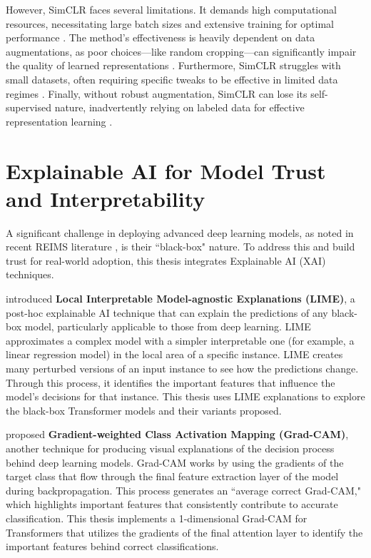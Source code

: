 However, SimCLR faces several limitations. It demands high computational resources, necessitating large batch sizes and extensive training for optimal performance \citep{Chen2020b}. The method's effectiveness is heavily dependent on data augmentations, as poor choices—like random cropping—can significantly impair the quality of learned representations \citep{Chen2020a}. Furthermore, SimCLR struggles with small datasets, often requiring specific tweaks to be effective in limited data regimes \citep{Kinakh2021}. Finally, without robust augmentation, SimCLR can lose its self-supervised nature, inadvertently relying on labeled data for effective representation learning \citep{Chen2020a}.

\section{Explainable AI for Model Trust and Interpretability}

A significant challenge in deploying advanced deep learning models, as noted in recent REIMS literature \citep{Cardoso2025}, is their ``black-box" nature. To address this and build trust for real-world adoption, this thesis integrates Explainable AI (XAI) techniques.

\cite{Ribeiro2016} introduced \textbf{Local Interpretable Model-agnostic Explanations (LIME)}, a post-hoc explainable AI technique that can explain the predictions of any black-box model, particularly applicable to those from deep learning. LIME approximates a complex model with a simpler interpretable one (for example, a linear regression model) in the local area of a specific instance. LIME creates many perturbed versions of an input instance to see how the predictions change. Through this process, it identifies the important features that influence the model's decisions for that instance. This thesis uses LIME explanations to explore the black-box Transformer models and their variants proposed.

\cite{Selvaraju2017} proposed \textbf{Gradient-weighted Class Activation Mapping (Grad-CAM)}, another technique for producing visual explanations of the decision process behind deep learning models. Grad-CAM works by using the gradients of the target class that flow through the final feature extraction layer of the model during backpropagation. This process generates an ``average correct Grad-CAM," which highlights important features that consistently contribute to accurate classification. This thesis implements a 1-dimensional Grad-CAM for Transformers that utilizes the gradients of the final attention layer to identify the important features behind correct classifications.

